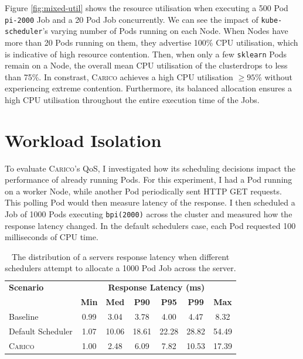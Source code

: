 Figure \ref{fig:mixed-util} shows the resource utilisation when executing a 500
Pod \texttt{pi-2000} Job and a 20 Pod  Job concurrently. We can
see the impact of \texttt{kube-scheduler}'s varying number of Pods running on
each Node. When Nodes have more than 20 Pods running on them, they advertise
100\% CPU utilisation, which is indicative of high resource contention. Then,
when only a few \texttt{sklearn} Pods remain on a Node, the overall mean CPU
utilisation of the clusterdrops to less than 75\%. In constrast, \textsc{Carico}
achieves a high CPU utilisation $\geq 95$\% without experiencing extreme
contention. Furthermore, its balanced allocation ensures a high CPU utilisation
throughout the entire execution time of the Jobs.

\section{Workload Isolation}
\label{sec:eval-isolation}
To evaluate \textsc{Carico}'s QoS, I investigated how its scheduling decisions impact the
performance of already running Pods. For this experiment, I had a Pod running on
a worker Node, while another Pod periodically sent HTTP GET requests. This
polling Pod would then measure latency of the response. I then scheduled a Job
of 1000 Pods executing \texttt{bpi(2000)} across the cluster and measured how
the response latency changed. In the default schedulers case, each Pod requested
100 milliseconds of CPU time.

\begin{table}[h!]
\centering
    \begin{tabular}{|l|c|c|c|c|c|c|}
    \hline
    \textbf{Scenario} & \multicolumn{6}{c|}{\textbf{Response Latency (ms)}} \\
    \cline{2-7}
    & \textbf{Min} & \textbf{Med} & \textbf{P90} & \textbf{P95} & \textbf{P99} & \textbf{Max} \\
    \hline
    Baseline & 0.99 & 3.04 & 3.78 & 4.00 & 4.47 & 8.32 \\
    Default Scheduler & 1.07 & 10.06 & 18.61 & 22.28 & 28.82 & 54.49\\
    \textsc{Carico}  & 1.00 & 2.48 & 6.09 & 7.82 & 10.53 & 17.39\\
    \hline
    \end{tabular}
    \caption{The distribution of a servers response latency when different
    schedulers attempt to allocate a 1000 Pod Job across the server.}
    \label{tab:impacted-latency}
\end{table}

